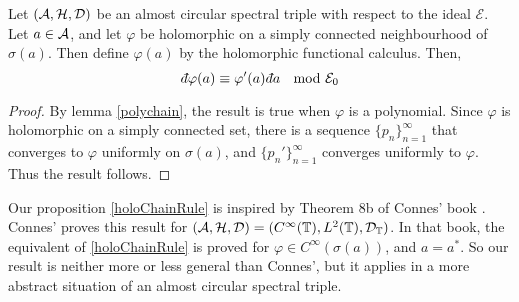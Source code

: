 \begin{proposition}
\label{holoChainRule}
    Let $(\mathcal{A},\mathcal{H},\mathcal{D})$ be an almost circular spectral triple with respect
    to the ideal $\mathcal{E}$. Let $a \in \mathcal{A}$,
    and let $\varphi$ be holomorphic on a simply connected neighbourhood of $\sigma(a)$.
    Then define $\varphi(a)$ by the holomorphic functional calculus. Then,
    \begin{equation}
        \qd \varphi(a) \equiv \varphi'(a)\qd a\;\mod{\mathcal{E}_0}
    \end{equation}
\end{proposition}
\begin{proof}
    By lemma \ref{polychain}, the result is true when $\varphi$
    is a polynomial. Since $\varphi$ is holomorphic on a simply connected set,
    there is a sequence $\{p_n\}_{n=1}^\infty$ that converges to $\varphi$
    uniformly on $\sigma(a)$, and $\{p_n'\}_{n=1}^\infty$ converges
    uniformly to $\varphi$. Thus the result follows.
\end{proof}
Our proposition \ref{holoChainRule} is inspired by Theorem 8b of Connes' 
book \cite{Connes94}. Connes' proves this result for $(\mathcal{A},\mathcal{H},\mathcal{D}) = (C^\infty(\mathbb{T}),L^2(\mathbb{T}),\mathcal{D}_{\mathbb{T}})$.
In that book, the equivalent of \ref{holoChainRule} is proved for $\varphi \in C^\infty(\sigma(a))$,
and $a = a^*$. So our result is neither more or less general than Connes', but it
applies in a more abstract situation of an almost circular spectral triple.


